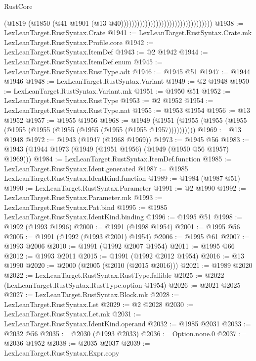 \begin{lexlean}{RustCore}
\begin{coremodule}
                                                                (@1819
                                                                  (@1850
                                                                    (@41
                                                                      @1901
                                                                      (@13
                                                                        @40))))))))))))))))))))))))))))))))))
@1938 := LexLeanTarget.RustSyntax.Crate
@1941 := LexLeanTarget.RustSyntax.Crate.mk LexLeanTarget.RustSyntax.Profile.core
@1942 := LexLeanTarget.RustSyntax.ItemDef
@1943 := @2 @1942
@1944 := LexLeanTarget.RustSyntax.ItemDef.enum
@1945 := LexLeanTarget.RustSyntax.RustType.adt
@1946 := @1945 @51
@1947 := @1944 @1946
@1948 := LexLeanTarget.RustSyntax.Variant
@1949 := @2 @1948
@1950 := LexLeanTarget.RustSyntax.Variant.mk
@1951 := @1950 @51
@1952 := LexLeanTarget.RustSyntax.RustType
@1953 := @2 @1952
@1954 := LexLeanTarget.RustSyntax.RustType.nat
@1955 := @1953 @1954
@1956 := @13 @1952
@1957 := @1955 @1956
@1968 := @1949 (@1951 (@1955 (@1955 (@1955 (@1955 (@1955 (@1955 (@1955 (@1955 (@1955 @1957))))))))))
@1969 := @13 @1948
@1972 := @1943 (@1947 (@1968 @1969))
@1973 := @1945 @56
@1983 := @1943 (@1944 @1973 (@1949 (@1951 @1956) (@1949 (@1950 @56 @1957) @1969)))
@1984 := LexLeanTarget.RustSyntax.ItemDef.function
@1985 := LexLeanTarget.RustSyntax.Ident.generated
@1987 := @1985 LexLeanTarget.RustSyntax.IdentKind.function
@1989 := @1984 (@1987 @51)
@1990 := LexLeanTarget.RustSyntax.Parameter
@1991 := @2 @1990
@1992 := LexLeanTarget.RustSyntax.Parameter.mk
@1993 := LexLeanTarget.RustSyntax.Pat.bind
@1995 := @1985 LexLeanTarget.RustSyntax.IdentKind.binding
@1996 := @1995 @51
@1998 := @1992 (@1993 @1996)
@2000 := @1991 (@1998 @1954)
@2001 := @1995 @56
@2005 := @1991 (@1992 (@1993 @2001) @1954)
@2006 := @1995 @61
@2007 := @1993 @2006
@2010 := @1991 (@1992 @2007 @1954)
@2011 := @1995 @66
@2012 := @1993 @2011
@2015 := @1991 (@1992 @2012 @1954)
@2016 := @13 @1990
@2020 := @2000 (@2005 (@2010 (@2015 @2016)))
@2021 := @1989 @2020
@2022 := LexLeanTarget.RustSyntax.RustType.fallible
@2025 := @2022 (LexLeanTarget.RustSyntax.RustType.option @1954)
@2026 := @2021 @2025
@2027 := LexLeanTarget.RustSyntax.Block.mk
@2028 := LexLeanTarget.RustSyntax.Let
@2029 := @2 @2028
@2030 := LexLeanTarget.RustSyntax.Let.mk
@2031 := LexLeanTarget.RustSyntax.IdentKind.operand
@2032 := @1985 @2031
@2033 := @2032 @56
@2035 := @2030 (@1993 @2033)
@2036 := Option.none.{0}
@2037 := @2036 @1952
@2038 := @2035 @2037
@2039 := LexLeanTarget.RustSyntax.Expr.copy

\end{coremodule}
\end{lexlean}
